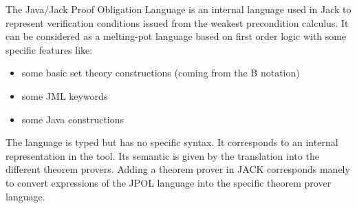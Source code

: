 \label{JPOL}
The Java/Jack Proof Obligation Language is an internal language used in Jack to represent verification conditions issued from the weakest precondition calculus. It can be considered as a melting-pot language based on first order logic with some specific features like:
\begin{itemize}
\item some basic set theory constructions (coming from the B notation)
\item some JML keywords
\item some Java constructions
\end{itemize}
The language is typed but has no specific syntax. It corresponds to an internal representation in the tool. Its semantic is given by the translation into the different theorem provers. Adding a theorem prover in JACK corresponds manely to convert expressions of the JPOL language into the specific theorem prover language.


